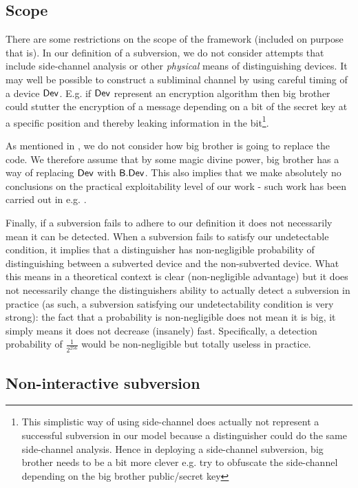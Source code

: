 \subsection{Scope}

There are some restrictions on the scope of the framework (included on purpose that is). In our definition of a subversion, we do not consider attempts that include side-channel analysis or other \emph{physical} means of distinguishing devices. It may well be possible to construct a subliminal channel by using careful timing of a device $\operatorname{\mathsf{Dev}}$. E.g. if $\operatorname{\mathsf{Dev}}$ represent an encryption algorithm then big brother could stutter the encryption of a message depending on a bit of the secret key at a specific position and thereby leaking information in the bit\footnote{This simplistic way of using side-channel does actually not represent a successful subversion in our model because a distinguisher could do the same side-channel analysis. Hence in deploying a side-channel subversion, big brother needs to be a bit more clever e.g. try to obfuscate the side-channel depending on the big brother public/secret key}. 

As mentioned in , we do not consider how big brother is going to replace the code. We therefore assume that by some magic divine power, big brother has a way of replacing $\operatorname{\mathsf{Dev}}$ with $\mathsf{B}.\mathsf{Dev}$. This also implies that we make absolutely no conclusions on the practical exploitability level of our work - such work has been carried out in e.g. \cite{Bernstein2014}. 

Finally, if a subversion fails to adhere to our definition it does not necessarily mean it can be detected. When a subversion fails to satisfy our undetectable condition, it implies that a distinguisher has non-negligible probability of distinguishing between a subverted device and the non-subverted device. What this means in a theoretical context is clear (non-negligible advantage) but it does not necessarily change the distinguishers ability to actually detect a subversion in practice (as such, a subversion satisfying our undetectability condition is very strong): the fact that a probability is non-negligible does not mean it is big, it simply means it does not decrease (insanely) fast. Specifically, a detection probability of $\frac{1}{2^{256}}$ would be non-negligible but totally useless in practice.

\subsection{Non-interactive subversion}

